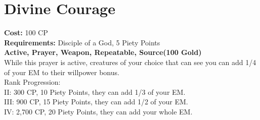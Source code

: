 \section{Divine Courage}\label{prayer:divineCourage}
\textbf{Cost:} 100 CP\\
\textbf{Requirements:} Disciple of a God, 5 Piety Points \\
\textbf{Active, Prayer, Weapon, Repeatable, Source(100 Gold)}\\
While this prayer is active, creatures of your choice that can see you can add 1/4 of your EM to their willpower bonus.
\\
Rank Progression:\\
II: 300 CP, 10 Piety Points, they can add 1/3 of your EM.\\
III: 900 CP, 15 Piety Points, they can add 1/2 of your EM.\\
IV: 2,700 CP, 20 Piety Points, they can add your whole EM.\\